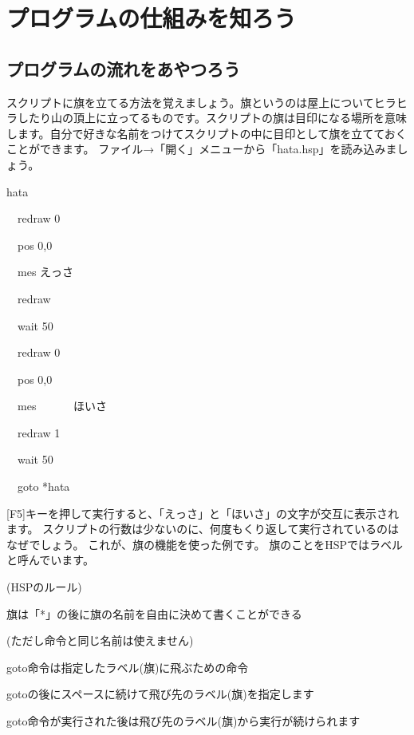 \clearpage

\section{プログラムの仕組みを知ろう}
\subsection{プログラムの流れをあやつろう}

スクリプトに旗を立てる方法を覚えましょう。旗というのは屋上についてヒラヒラしたり山の頂上に立ってるものです。スクリプトの旗は目印になる場所を意味します。自分で好きな名前をつけてスクリプトの中に目印として旗を立てておくことができます。
ファイル→「開く」メニューから「hata.hsp」を読み込みましょう。

\begin{description}
    \item *hata
    \item \ \ redraw 0
    \item \ \ pos 0,0
    \item \ \ mes {\textquotedbl}えっさ{\textquotedbl}
    \item \ \ redraw 
    \item \ \ wait 50
    \item \ \ redraw 0
    \item \ \ pos 0,0
    \item \ \ mes {\textquotedbl}　　　ほいさ{\textquotedbl}
    \item \ \ redraw 1
    \item \ \ wait 50
    \item \ \ goto *hata
\end{description}

[F5]キーを押して実行すると、「えっさ」と「ほいさ」の文字が交互に表示されます。
スクリプトの行数は少ないのに、何度もくり返して実行されているのはなぜでしょう。
これが、旗の機能を使った例です。
旗のことをHSPではラベルと呼んでいます。

\begin{description}
    \item (HSPのルール)
\end{description}

\begin{description}
    \item 旗は「*」の後に旗の名前を自由に決めて書くことができる
    \item (ただし命令と同じ名前は使えません)
    \item goto命令は指定したラベル(旗)に飛ぶための命令
    \item gotoの後にスペースに続けて飛び先のラベル(旗)を指定します
    \item goto命令が実行された後は飛び先のラベル(旗)から実行が続けられます
\end{description}

